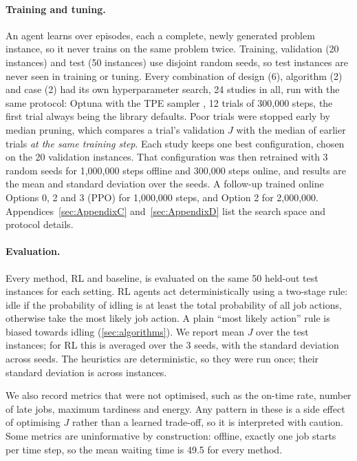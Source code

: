 \documentclass[12pt]{article}
\begin{document}
\paragraph{Training and tuning.} An agent learns over episodes, each a complete, newly generated problem instance, so it never trains on the same problem twice. Training, validation (20 instances) and test (50 instances) use disjoint random seeds, so test instances are never seen in training or tuning. Every combination of design (6), algorithm (2) and case (2) had its own hyperparameter search, 24 studies in all, run with the same protocol: Optuna \cite{akiba2019optuna} with the TPE sampler \cite{bergstra2011tpe}, 12 trials of 300,000 steps, the first trial always being the library defaults. Poor trials were stopped early by median pruning, which compares a trial's validation $J$ with the median of earlier trials \emph{at the same training step}. Each study keeps one best configuration, chosen on the 20 validation instances. That configuration was then retrained with 3 random seeds for 1,000,000 steps offline and 300,000 steps online, and results are the mean and standard deviation over the seeds. A follow-up trained online Options 0, 2 and 3 (PPO) for 1,000,000 steps, and Option 2 for 2,000,000. Appendices~\ref{sec:AppendixC} and~\ref{sec:AppendixD} list the search space and protocol details.

\paragraph{Evaluation.}\label{sec:evaluation} Every method, RL and baseline, is evaluated on the same 50 held-out test instances for each setting. RL agents act deterministically using a two-stage rule: idle if the probability of idling is at least the total probability of all job actions, otherwise take the most likely job action. A plain ``most likely action'' rule is biased towards idling (\cref{sec:algorithms}). We report mean $J$ over the test instances; for RL this is averaged over the 3 seeds, with the standard deviation across seeds. The heuristics are deterministic, so they were run once; their standard deviation is across instances.

We also record metrics that were not optimised, such as the on-time rate, number of late jobs, maximum tardiness and energy. Any pattern in these is a side effect of optimising $J$ rather than a learned trade-off, so it is interpreted with caution. Some metrics are uninformative by construction: offline, exactly one job starts per time step, so the mean waiting time is 49.5 for every method.
\end{document}
